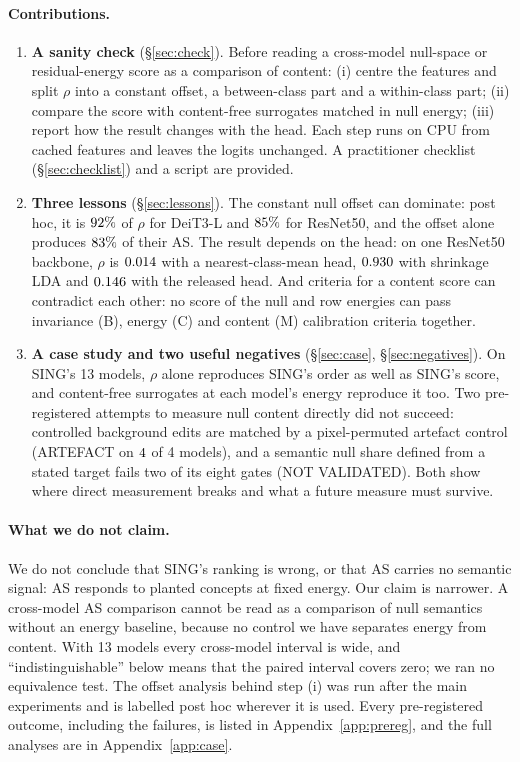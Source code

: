 \documentclass[10pt]{article}
\begin{document}
\paragraph{Contributions.}
\begin{enumerate}
\item \textbf{A sanity check} (\S\ref{sec:check}). Before reading a cross-model null-space or residual-energy score as a comparison of content: (i) centre the features and split $\rho$ into a constant offset, a between-class part and a within-class part; (ii) compare the score with content-free surrogates matched in null energy; (iii) report how the result changes with the head. Each step runs on CPU from cached features and leaves the logits unchanged. A practitioner checklist (\S\ref{sec:checklist}) and a script are provided.
\item \textbf{Three lessons} (\S\ref{sec:lessons}). The constant null offset can dominate: post hoc, it is $92\%$ of $\rho$ for DeiT3-L and $85\%$ for ResNet50, and the offset alone produces $83\%$ of their AS. The result depends on the head: on one ResNet50 backbone, $\rho$ is $0.014$ with a nearest-class-mean head, $0.930$ with shrinkage LDA and $0.146$ with the released head. And criteria for a content score can contradict each other: no score of the null and row energies can pass invariance (B), energy (C) and content (M) calibration criteria together.
\item \textbf{A case study and two useful negatives} (\S\ref{sec:case}, \S\ref{sec:negatives}). On SING's 13 models, $\rho$ alone reproduces SING's order as well as SING's score, and content-free surrogates at each model's energy reproduce it too. Two pre-registered attempts to measure null content directly did not succeed: controlled background edits are matched by a pixel-permuted artefact control (ARTEFACT on $4$ of 4 models), and a semantic null share defined from a stated target fails two of its eight gates (NOT VALIDATED). Both show where direct measurement breaks and what a future measure must survive.
\end{enumerate}

\paragraph{What we do not claim.}
We do not conclude that SING's ranking is wrong, or that AS carries no semantic signal: AS responds to planted concepts at fixed energy.
Our claim is narrower. A cross-model AS comparison cannot be read as a comparison of null semantics without an energy baseline, because no control we have separates energy from content.
With 13 models every cross-model interval is wide, and ``indistinguishable'' below means that the paired interval covers zero; we ran no equivalence test.
The offset analysis behind step (i) was run after the main experiments and is labelled post hoc wherever it is used.
Every pre-registered outcome, including the failures, is listed in Appendix~\ref{app:prereg}, and the full analyses are in Appendix~\ref{app:case}.
\end{document}
